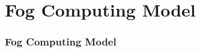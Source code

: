 \documentclass[10pt, pdf, xcolor=pdftex, dvipsnames, table]{beamer}
\begin{document}
\begin{frame}
\end{frame}


\section[Fog Computing Model]{Fog Computing Model}

\begin{frame}
	\tableofcontents[currentsection]
\end{frame}

\begin{frame}
	\frametitle{Fog Computing Model}
\end{frame}
\end{document}
